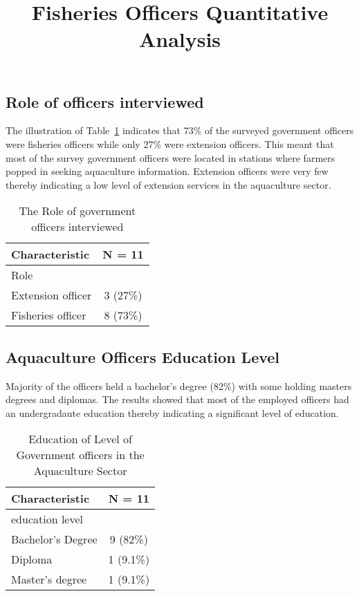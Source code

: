 \documentclass[
  letterpaper,
  DIV=11,
  numbers=noendperiod]{scrartcl}
\title{Fisheries Officers Quantitative Analysis}
\author{}
\date{}
\begin{document}
\maketitle

\subsection{Role of officers
interviewed}\label{role-of-officers-interviewed}

The illustration of Table~\ref{tbl-role} indicates that 73\% of the
surveyed government officers were fisheries officers while only 27\%
were extension officers. This meant that most of the survey government
officers were located in stations where farmers popped in seeking
aquaculture information. Extension officers were very few thereby
indicating a low level of extension services in the aquaculture sector.

\begin{longtable}[]{@{}lc@{}}

\caption{\label{tbl-role}The Role of government officers interviewed}

\tabularnewline

\toprule\noalign{}
\textbf{Characteristic} & \textbf{N = 11} \\
\midrule\noalign{}
\endhead
\bottomrule\noalign{}
\endlastfoot
Role & \\
Extension officer & 3 (27\%) \\
Fisheries officer & 8 (73\%) \\

\end{longtable}

\subsection{Aquaculture Officers Education
Level}\label{aquaculture-officers-education-level}

Majority of the officers held a bachelor's degree (82\%) with some
holding masters degrees and diplomas. The results showed that most of
the employed officers had an undergradaute education thereby indicating
a significant level of education.

\begin{longtable}[]{@{}lc@{}}

\caption{\label{tbl-edulvl}Education of Level of Government officers in
the Aquaculture Sector}

\tabularnewline

\toprule\noalign{}
\textbf{Characteristic} & \textbf{N = 11} \\
\midrule\noalign{}
\endhead
\bottomrule\noalign{}
\endlastfoot
education level & \\
Bachelor's Degree & 9 (82\%) \\
Diploma & 1 (9.1\%) \\
Master's degree & 1 (9.1\%) \\

\end{longtable}
\end{document}
